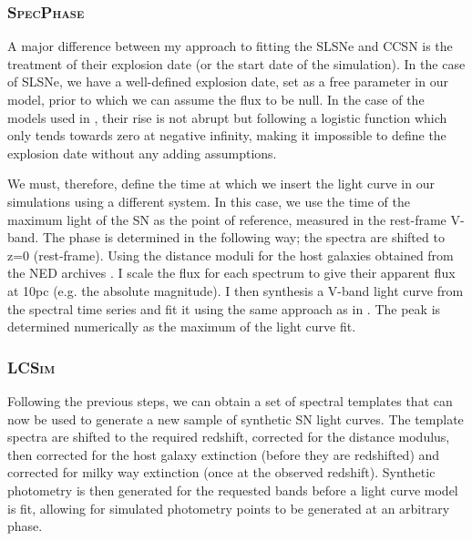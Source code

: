 \subsubsection{\textsc{SpecPhase}}
A major difference between my approach to fitting the SLSNe and CCSN is the treatment of their explosion date (or the start date of the simulation). In the case of SLSNe, we have a well-defined explosion date, set as a free parameter in our model, prior to which we can assume the flux to be null. In the case of the models used in , their rise is not abrupt but following a logistic function which only tends towards zero at negative infinity, making it impossible to define the explosion date without any adding assumptions.

We must, therefore, define the time at which we insert the light curve in our simulations using a different system. In this case, we use the time of the maximum light of the SN as the point of reference, measured in the rest-frame V-band. The phase is determined in the following way; the spectra are shifted to z=0 (rest-frame). Using the distance moduli for the host galaxies obtained from the NED archives \citep{Tully1988}. I scale the flux for each spectrum to give their apparent flux at 10pc (e.g. the absolute magnitude). I then synthesis a V-band light curve from the spectral time series and fit it using the same approach as in . The peak is determined numerically as the maximum of the light curve fit.

\subsubsection{\textsc{LCSim}}
Following the previous steps, we can obtain a set of spectral templates that can now be used to generate a new sample of synthetic SN light curves. The template spectra are shifted to the required redshift, corrected for the distance modulus, then corrected for the host galaxy extinction (before they are redshifted) and corrected for milky way extinction (once at the observed redshift). Synthetic photometry is then generated for the requested bands before a light curve model is fit, allowing for simulated photometry points to be generated at an arbitrary phase.

